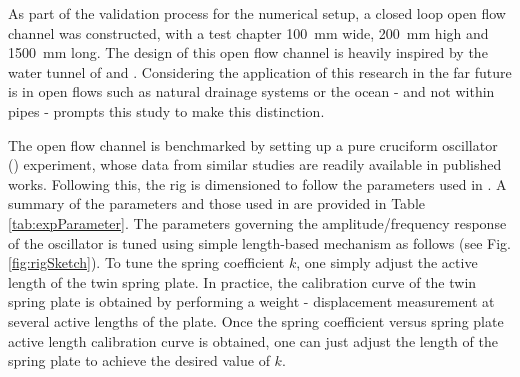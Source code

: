 \documentclass[oneside]{utmthesis}
\begin{document}
As part of the validation process for the numerical setup, a closed loop open flow channel was constructed, with a test chapter \SI{100}{\milli\metre} wide, \SI{200}{\milli\metre} high and \SI{1500}{\milli\metre} long. The design of this open flow channel is heavily inspired by the water tunnel of \citet{Nguyen2012} and \citet{Koide2013}. Considering the application of this research in the far future is in open flows such as natural drainage systems or the ocean - and not within pipes - prompts this study to make this distinction.

The open flow channel is benchmarked by setting up a pure cruciform oscillator (\angfi{}) experiment, whose data from similar studies are readily available in published works. Following this, the rig is dimensioned to follow the parameters used in \citet{Koide2013}. A summary of the parameters and those used in \citet{Koide2013} are provided in Table \ref{tab:expParameter}. The parameters governing the amplitude/frequency response of the oscillator is tuned using simple length-based mechanism as follows (see Fig. \ref{fig:rigSketch}). To tune the spring coefficient $k$, one simply adjust the active length of the twin spring plate. In practice, the calibration curve of the twin spring plate is obtained by performing a weight - displacement measurement \citep{Sun2016} at several active lengths of the plate. Once the spring coefficient versus spring plate active length calibration curve is obtained, one can just adjust the length of the spring plate to achieve the desired value of $k$.
\end{document}

